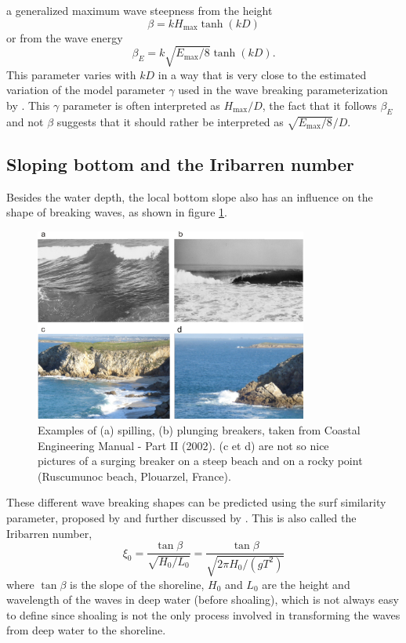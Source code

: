a generalized maximum wave steepness from the height 
\begin{equation}
 \beta = k H_{\max} \tanh(kD)
\end{equation}
or from the wave energy 
\begin{equation}
 \beta_{E} = k \sqrt{E_{\max} / 8} \tanh(kD).
\end{equation}
This parameter varies with $kD$ in a way that is very close to the estimated variation of the model parameter $\gamma$ used in the wave 
breaking parameterization by \cite{Ruessink&al.2003}. This $\gamma$ parameter is often interpreted as $H_{\max}/D$, the fact that it 
follows $\beta_E$ and not $\beta$ suggests that it should rather be interpreted as $\sqrt{E_{\max} / 8}/D$. 

\subsection{Sloping bottom and the Iribarren number}
Besides the water depth, the local bottom slope also has an influence on 
the shape of breaking waves, as shown in figure \ref{f_surf_cerc}.
\begin{figure}[htb]
\centerline{\includegraphics[width=0.8\textwidth]{FIGS_CH_SURF/f_surf_cerc_plus.png}}
\caption{Examples of (a) spilling, (b) plunging breakers, taken from Coastal Engineering Manual - Part II (2002).  (c et d) 
are not so nice pictures of a surging breaker on a steep beach and on a rocky point (Ruscumunoc beach, Plouarzel, France).} \label{f_surf_cerc}
\end{figure}
These different wave breaking shapes can be predicted using the surf similarity parameter, proposed by \cite{Iribarren&Nogales1949} and further 
discussed by \cite{Battjes1974}. This is also called the Iribarren number, 
\begin{equation}
    \xi_0=\frac{\tan \beta}{\sqrt{H_0 /L_0}}=\frac{\tan \beta}{\sqrt{2 \pi H_0/(gT^2)}}
\end{equation}
where  $\tan \beta$ is the slope of the shoreline, $H_0$ and $L_0$ are the height and wavelength of the waves in deep 
water (before shoaling), which is not always easy to define since shoaling is not the only process involved in transforming the 
waves from deep water  to the shoreline. 

